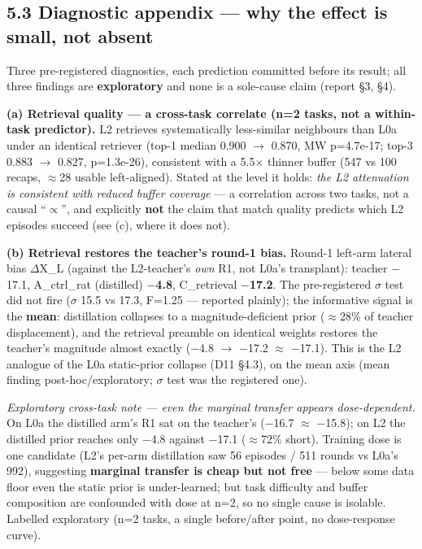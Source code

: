 \subsection*{5.3 Diagnostic appendix --- why the effect is small, not absent}

Three pre-registered diagnostics, each prediction committed before its
result; all three findings are \textbf{exploratory} and none is a sole-cause
claim (report \S3, \S4).

\textbf{(a) Retrieval quality --- a cross-task correlate (n=2 tasks, not a
within-task predictor).} L2 retrieves systematically less-similar
neighbours than L0a under an identical retriever (top-1 median 0.900 $\rightarrow$
0.870, MW p=4.7e-17; top-3 0.883 $\rightarrow$ 0.827, p=1.3e-26), consistent with a
5.5$\times$ thinner buffer (547 vs 100 recaps, $\approx$28 usable left-aligned). Stated
at the level it holds: \emph{the L2 attenuation is consistent with reduced
buffer coverage} --- a correlation across two tasks, not a causal ``$\propto$'', and
explicitly \textbf{not} the claim that match quality predicts which L2 episodes
succeed (see (c), where it does not).

\textbf{(b) Retrieval restores the teacher's round-1 bias.} Round-1 left-arm
lateral bias $\Delta$X\_L (against the L2-teacher's \emph{own} R1, not L0a's
transplant): teacher $-$17.1, A\_ctrl\_rat (distilled) \textbf{$-$4.8}, C\_retrieval
\textbf{$-$17.2}. The pre-registered $\sigma$ test did not fire ($\sigma$ 15.5 vs 17.3,
F=1.25 --- reported plainly); the informative signal is the \textbf{mean}:
distillation collapses to a magnitude-deficient prior ($\approx$28\% of teacher
displacement), and the retrieval preamble on identical weights restores
the teacher's magnitude almost exactly ($-$4.8 $\rightarrow$ $-$17.2 $\approx$ $-$17.1). This is the
L2 analogue of the L0a static-prior collapse (D11 \S4.3), on the mean axis
(mean finding post-hoc/exploratory; $\sigma$ test was the registered one).

\emph{Exploratory cross-task note --- even the marginal transfer appears
dose-dependent.} On L0a the distilled arm's R1 sat on the teacher's
($-$16.7 $\approx$ $-$15.8); on L2 the distilled prior reaches only $-$4.8 against
$-$17.1 ($\approx$72\% short). Training dose is one candidate (L2's per-arm
distillation saw 56 episodes / 511 rounds vs L0a's 992), suggesting
\textbf{marginal transfer is cheap but not free} --- below some data floor even
the static prior is under-learned; but task difficulty and buffer
composition are confounded with dose at n=2, so no single cause is
isolable. Labelled exploratory (n=2 tasks, a single before/after point,
no dose-response curve).

